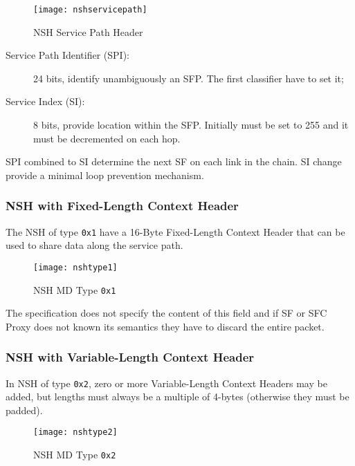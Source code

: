 \begin{figure}[H]
  \centering
  \texttt{[image: nshservicepath]}
  \caption[NSH Service Path Header]{NSH Service Path Header~\cite{rfc8300}}
  \label{chap:background:img:nshpath}
\end{figure}

\begin{description}
  \item[Service Path Identifier (SPI):] 24 bits, identify unambiguously an SFP.
  The first classifier have to set it;
  \item[Service Index (SI):] 8 bits, provide location within the SFP. Initially
  must be set to 255 and it must be decremented on each hop.
\end{description}

SPI combined to SI determine the next SF on each link in the chain. SI change
provide a minimal loop prevention mechanism.

\subsubsection{NSH with Fixed-Length Context Header}
\label{subsubsec:background:flch}
The NSH of type \texttt{0x1} have a 16-Byte Fixed-Length Context Header that
can be used to share data along the service path.

\begin{figure}[H]
  \centering
  \texttt{[image: nshtype1]}
  \caption[NSH MD Type \texttt{0x1}]{NSH MD Type \texttt{0x1}~\cite{rfc8300}}
  \label{chap:background:img:nshtype1}
\end{figure}

The specification does not specify the content of this field and if SF or SFC
Proxy does not known its semantics they have to discard the entire packet. 

\subsubsection{NSH with Variable-Length Context Header}
\label{subsubsec:background:vlch}
In NSH of type \texttt{0x2}, zero or more Variable-Length Context Headers may
be added, but lengths must always be a multiple of 4-bytes (otherwise they must
be padded).

\begin{figure}[H]
  \centering
  \texttt{[image: nshtype2]}
  \caption[NSH MD Type \texttt{0x2}]{NSH MD Type \texttt{0x2}~\cite{rfc8300}}
  \label{chap:background:img:nshtype2}
\end{figure}

